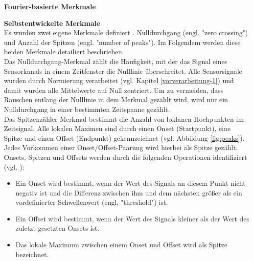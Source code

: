 \textbf{Fourier-basierte Merkmale \\}


\textbf{Selbstentwickelte Merkmale \\}
Es wurden zwei eigene Merkmale definiert \cite{bscpiet}. Nulldurchgang (engl. "zero crossing") und Anzahl der Spitzen (engl. "number of peaks"). Im Folgendem werden diese beiden Merkmale detailiert beschrieben. \\

Das Nulldurchgang-Merkmal zählt die Häufigkeit, mit der das Signal eines Sensorkanals in einem Zeitfenster die Nulllinie überschreitet.
Alle Sensorsignale wurden durch Normierung verarbeitet (vgl. Kapitel \ref{vorverarbeitung-1}) und damit wurden alle Mittelwerte auf Null zentriert.
Um zu vermeiden, dass Rauschen entlang der Nulllinie in dem Merkmal gezählt wird, wird nur ein Nulldurchgang in einer bestimmten Zeitspanne gezählt. \\


Das Spitzenzähler-Merkmal bestimmt die Anzahl von loklanen Hochpunkten im Zeitsignal.
Alle lokalen Maximen sind durch einen Onset (Startpunkt), eine Spitze und einen Offset (Endpunkt) gekennzeichnet (vgl. Abbildung \ref{fig:peaks}). 
Jedes Vorkommen einer Onset/Offset-Paarung wird hierbei als Spitze gezählt.
Onsets, Spitzen und Offsets werden durch die folgenden Operationen identifiziert (vgl. \cite{bscGouverneur}):

\begin{itemize} %
  \item Ein Onset wird bestimmt, wenn der Wert des Signals an diesem Punkt nicht negativ ist und die Differenz zwischen ihm und dem nächsten größer als ein vordefinierter Schwellenwert (engl. "threshold") ist.

  \item Ein Offset wird bestimmt, wenn der Wert des Signals kleiner als der Wert des zuletzt gesetzten Onsets ist.

  \item Das lokale Maximum zwischen einem Onset und Offset wird als Spitze bezeichnet.
\end{itemize} \vspace{0.2cm}


